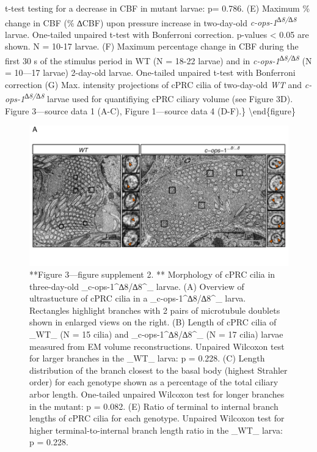 \documentclass[
]{article}
\begin{document}
t-test testing for a decrease in CBF in mutant larvae: p= 0.786. (E)
Maximum \% change in CBF (\% ∆CBF) upon pressure increase in two-day-old
\emph{c-ops-1\textsuperscript{∆8/∆8}} larvae. One-tailed unpaired t-test
with Bonferroni correction. p-values \textless{} 0.05 are shown. N =
10-17 larvae. (F) Maximum percentage change in CBF during the first 30 s
of the stimulus period in WT (N = 18-22 larvae) and in
\emph{c-ops-1\textsuperscript{∆8/∆8}} (N = 10---17 larvae) 2-day-old
larvae. One-tailed unpaired t-test with Bonferroni correction (G) Max.
intensity projections of cPRC cilia of two-day-old \emph{WT} and
\emph{c-ops-1\textsuperscript{∆8/∆8}} larvae used for quantifiying cPRC
ciliary volume (see Figure 3D). Figure 3---source data 1 (A-C), Figure
1---source data 4 (D-F).\}\label{fig:unnamed-chunk-13}
\textbackslash end\{figure\}

\begin{figure}
\includegraphics[width=25.69in]{Figures/Figure3-FigureSupplement2} \caption{**Figure 3—figure supplement 2. ** Morphology of cPRC cilia  in three-day-old _c-ops-1^∆8/∆8^_ larvae. (A) Overview of ultrastucture of cPRC cilia in a _c-ops-1^∆8/∆8^_ larva. Rectangles highlight branches with 2 pairs of microtubule doublets shown in enlarged views on the right. (B) Length of cPRC cilia of _WT_ (N = 15 cilia) and _c-ops-1^∆8/∆8^_ (N = 17 cilia) larvae measured from EM volume reconstructions. Unpaired Wilcoxon test for larger branches in the _WT_ larva: p = 0.228. (C) Length distribution of the branch closest to the basal body (highest Strahler order) for each genotype shown as a percentage of the total ciliary arbor length. One-tailed unpaired Wilcoxon test for longer branches in the mutant: p = 0.082. (E) Ratio of terminal to internal branch lengths of cPRC cilia for each genotype. Unpaired Wilcoxon test for higher terminal-to-internal branch length ratio in the _WT_ larva: p = 0.228. }\label{fig:unnamed-chunk-14}
\end{figure}
\end{document}
